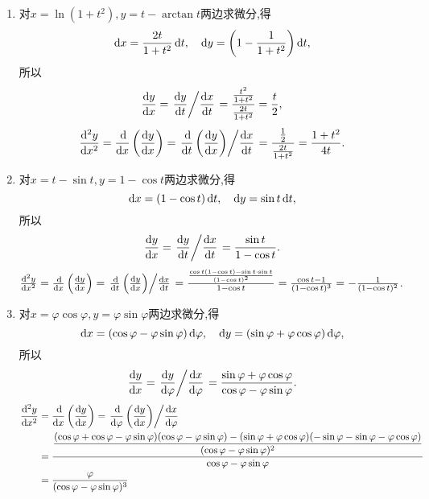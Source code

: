 \begin{solution}
    \begin{enumerate}
        \item 对$x = \ln(1+t^2),y = t-\arctan t$两边求微分,得
        $$\operatorname{d\!} x = \frac{2t}{1+t^2} \operatorname{d\!} t, \quad \operatorname{d\!} y = \left(1-\frac{1}{1+t^2}\right) \operatorname{d\!} t,$$所以
          $$
              \frac{\operatorname{d\!} y}{\operatorname{d\!} x} = \left.\dfrac{\operatorname{d\!} y}{\operatorname{d\!} t}\middle\slash\dfrac{\operatorname{d\!} x}{\operatorname{d\!} t}\right. = \frac{\frac{t^2}{1+t^2}}{\frac{2t}{1+t^2}} = \frac{t}{2},
          $$
          $$\frac{\dif\,\!^2 y}{\dif x^2} = \frac{\dif}{\dif x} \left( \frac{\dif y}{\dif x} \right) =
              \flatfrac{\frac{\dif}{\dif t} \left( \frac{\dif y}{\dif x} \right)}{\frac{\dif x}{\dif t} }= \frac{\frac{1}{2}}{\frac{2t}{1+t^2}} = \frac{1+t^2}{4t}.$$
        \item 对$x = t-\sin t,y = 1-\cos t$两边求微分,得
        $$\operatorname{d\!} x = (1-\cos t) \operatorname{d\!} t, \quad \operatorname{d\!} y = \sin t \operatorname{d\!} t,$$所以
          $$
              \frac{\operatorname{d\!} y}{\operatorname{d\!} x} = \left.\dfrac{\operatorname{d\!} y}{\operatorname{d\!} t}\middle\slash\dfrac{\operatorname{d\!} x}{\operatorname{d\!} t}\right. = \frac{\sin t}{1-\cos t}.
          $$
          $\frac{\dif\,\!^2 y}{\dif x^2} = \frac{\dif}{\dif x} \left( \frac{\dif y}{\dif x} \right) =
              \flatfrac{\frac{\dif}{\dif t} \left( \frac{\dif y}{\dif x} \right)}{\frac{\dif x}{\dif t} }= \frac{\frac{\cos t(1-\cos t) - \sin t \cdot \sin t}{(1-\cos t)^2}}{1-\cos t} = \frac{\cos t - 1}{(1-\cos t)^3} = -\frac{1}{(1-\cos t)^2}$.
        \item 对$x = \varphi\cos\varphi,y = \varphi\sin\varphi$两边求微分,得
        $$\operatorname{d\!} x = (\cos\varphi - \varphi\sin\varphi) \operatorname{d\!} \varphi, \quad \operatorname{d\!} y = (\sin\varphi + \varphi\cos\varphi) \operatorname{d\!} \varphi,$$所以
          $$
              \frac{\operatorname{d\!} y}{\operatorname{d\!} x} = \left.\dfrac{\operatorname{d\!} y}{\operatorname{d\!} \varphi}\middle\slash\dfrac{\operatorname{d\!} x}{\operatorname{d\!} \varphi}\right. = \frac{\sin\varphi + \varphi\cos\varphi}{\cos\varphi - \varphi\sin\varphi}.
          $$
              \begin{align*}
                \frac{\dif\,\!^2 y}{\dif x^2} &=\frac{\dif}{\dif x} \left( \frac{\dif y}{\dif x} \right)=\flatfrac{\frac{\dif}{\dif \varphi} \left( \frac{\dif y}{\dif x} \right)}{\frac{\dif x}{\dif \varphi} }\\
                &=\dfrac{\dfrac{(\cos\varphi + \cos\varphi - \varphi\sin\varphi)(\cos\varphi - \varphi\sin\varphi) - (\sin\varphi + \varphi\cos\varphi)(-\sin\varphi - \sin\varphi - \varphi\cos\varphi)}{(\cos\varphi - \varphi\sin\varphi)^2}}{\cos\varphi - \varphi\sin\varphi}\\
                &=\frac{\varphi}{(\cos\varphi - \varphi\sin\varphi)^3}

\end{align*}
\end{enumerate}
\end{solution}
